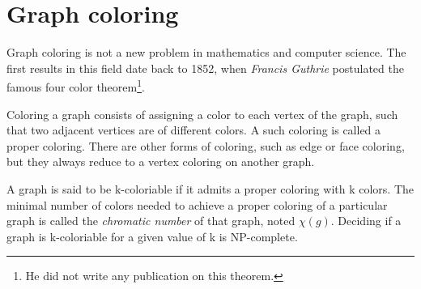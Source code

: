 \section{Graph coloring}

Graph coloring is not a new problem in mathematics and computer science. The first results in this field date back to 1852, when \emph{Francis Guthrie} postulated the famous four color theorem\footnote{He did not write any publication on this theorem.}.

Coloring a graph consists of assigning a color to each vertex of the graph, such that two adjacent vertices are of different colors. A such coloring is called a proper coloring. There are other forms of coloring, such as edge or face coloring, but they always reduce to a vertex coloring on another graph.

A graph is said to be k-coloriable if it admits a proper coloring with k colors. The minimal number of colors needed to achieve a proper coloring of a particular graph is called the \textit{chromatic number} of that graph, noted $ \chi (g)$. Deciding if a graph is k-coloriable for a given value of k is NP-complete.
